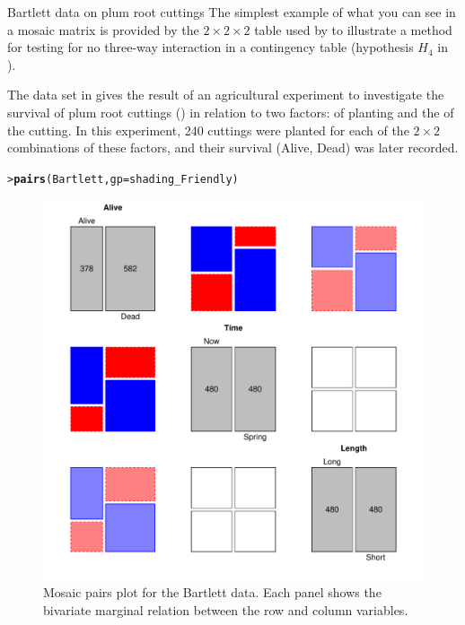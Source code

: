 \documentclass[10pt,krantz2]{krantz}\usepackage[]{graphicx}\usepackage[]{color}
\makeatletter
\newcommand{\hlstd}[1]{\textcolor[rgb]{0.345,0.345,0.345}{#1}}%
\newcommand{\hlkwc}[1]{\textcolor[rgb]{0.333,0.667,0.333}{#1}}%
\newcommand{\hlkwd}[1]{\textcolor[rgb]{0.737,0.353,0.396}{\textbf{#1}}}%
\newenvironment{kframe}{%
 \def\at@end@of@kframe{}%
 \ifinner\ifhmode%
  \def\at@end@of@kframe{\end{minipage}}%
  \begin{minipage}{\columnwidth}%
 \fi\fi%
 \def\FrameCommand##1{\hskip\@totalleftmargin \hskip-\fboxsep
 \colorbox{shadecolor}{##1}\hskip-\fboxsep
     \hskip-\linewidth \hskip-\@totalleftmargin \hskip\columnwidth}%
 \MakeFramed {\advance\hsize-\width
   \@totalleftmargin\z@ \linewidth\hsize
   \@setminipage}}%
 {\par\unskip\endMakeFramed%
 \at@end@of@kframe}
\newenvironment{knitrout}{}{} %
\renewenvironment{knitrout}{\small\renewcommand{\baselinestretch}{.85}}{} %
\makeatother
\begin{document}
\begin{Example}[bartlett]{Bartlett data on plum root cuttings}
The simplest example of what you can see in a mosaic matrix is
provided by the $2 \times 2 \times 2$ table
used by \citet{Bartlett:35}
to illustrate a method for testing for no three-way interaction in a contingency table
(hypothesis $H_4$ in ).

The data set  in 
gives the result of an agricultural experiment to
investigate the survival of plum root cuttings ()
in relation to two factors:  of planting and the  of the cutting.
In this experiment, 240 cuttings were planted for each of the $2 \times 2$ combinations of these factors, and their survival (Alive, Dead) was later recorded.

\begin{knitrout}
\color{fgcolor}\begin{kframe}
\begin{alltt}
\hlstd{> }\hlkwd{pairs}\hlstd{(Bartlett,} \hlkwc{gp} \hlstd{= shading_Friendly)}
\end{alltt}
\end{kframe}\begin{figure}[!htb]

\centerline{\includegraphics[width=.8\textwidth]{ch05/fig/bartlett-pairs-1} }

\caption[Mosaic pairs plot for the Bartlett data]{Mosaic pairs plot for the Bartlett data. Each panel shows the bivariate marginal relation between the row and column variables.\label{fig:bartlett-pairs}}
\end{figure}



\end{knitrout}
\end{Example}
\end{document}
